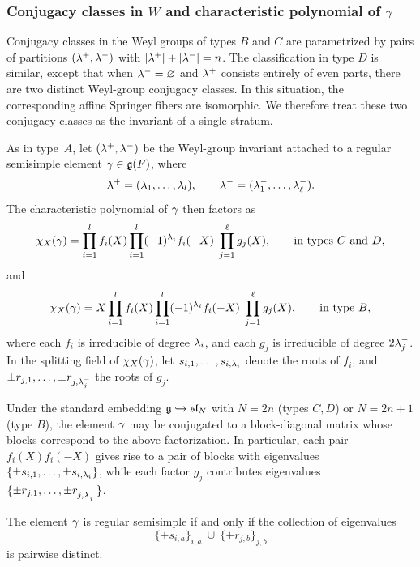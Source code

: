 \documentclass[11pt]{article}
\numberwithin{equation}{section}
\begin{document}
\subsubsection{Conjugacy classes in $W$ and characteristic polynomial of $\gamma$}
Conjugacy classes in the Weyl groups of types $B$ and $C$ are parametrized by
pairs of partitions $(\lambda^+,\lambda^-)$ with $|\lambda^+|+|\lambda^-|=n$.
The classification in type $D$ is similar, except that when $\lambda^-=\varnothing$
and $\lambda^+$ consists entirely of even parts, there are two distinct Weyl-group
conjugacy classes. In this situation, the corresponding affine Springer fibers are isomorphic. We therefore treat these two conjugacy classes as the invariant of a single stratum.

As in type~$A$, let $(\lambda^+,\lambda^-)$ be the Weyl-group invariant attached to a
regular semisimple element $\gamma\in\mathfrak{g}(F)$, where
\[
\lambda^+=(\lambda_1,\dots,\lambda_l),\qquad 
\lambda^-=(\lambda^-_1,\dots,\lambda^-_\ell).
\]
The characteristic polynomial of $\gamma$ then factors as
\[
\chi_X(\gamma)
=
\prod_{i=1}^{l} f_i(X)\prod_{i=1}^l (-1)^{\lambda_i}f_i(-X)\;
\prod_{j=1}^{\ell} g_j(X),
\qquad \text{in types } C \text{ and } D,
\]
and
\[
\chi_X(\gamma)
=
X\prod_{i=1}^{l} f_i(X)\prod_{i=1}^l (-1)^{\lambda_i}f_i(-X)\;
\prod_{j=1}^{\ell} g_j(X),
\qquad \text{in type } B,
\]
where each $f_i$ is irreducible of degree $\lambda_i$, and each $g_j$ is irreducible
of degree $2\lambda^-_j$. In the splitting field of $\chi_X(\gamma)$, let $s_{i,1},\dots,s_{i,\lambda_i}$ denote the roots of $f_i$, and $\pm r_{j,1},\dots,\pm r_{j,\lambda^-_j}$ the roots of $g_j$.

Under the standard embedding $\mathfrak{g}\hookrightarrow\mathfrak{sl}_N$ with
$N=2n$ (types $C,D$) or $N=2n+1$ (type $B$), the element $\gamma$ may be conjugated
to a block-diagonal matrix whose blocks correspond to the above factorization. In particular, each pair $f_i(X)f_i(-X)$ gives rise to a pair of blocks with
eigenvalues $\{\pm s_{i,1},\dots,\pm s_{i,\lambda_i}\}$, while each factor
$g_j$ contributes eigenvalues
$\{\pm r_{j,1},\dots,\pm r_{j,\lambda^-_j}\}$.


The element $\gamma$ is regular semisimple if and only if the collection of
eigenvalues
\[
\{\pm s_{i,a}\}_{i,a}\ \cup\ \{\pm r_{j,b}\}_{j,b}
\]
is pairwise distinct.
\end{document}
